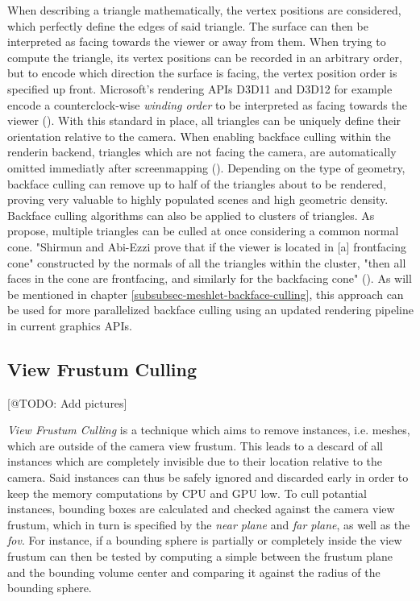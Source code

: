 \noindent
When describing a triangle mathematically, the vertex positions are considered, which perfectly define the edges of 
said triangle. The surface can then be interpreted as facing towards the viewer or away from them. 
When trying to compute the triangle, its vertex positions can be recorded in an arbitrary order, but to encode which direction 
the surface is facing, the vertex position order is specified up front. Microsoft's rendering \ac{API}s D3D11 and D3D12 for 
example encode a counterclock-wise \emph{winding order} to be interpreted as facing towards the viewer (\cite{D3DTopology2020}).
With this standard in place, all triangles can be uniquely define their orientation relative to the camera.
When enabling backface culling within the renderin backend, triangles which are not facing the camera, are automatically omitted 
immediatly after screenmapping (\cite{AkenineMoeller2018}). Depending on the type of geometry, backface culling can remove up to 
half of the triangles about to be rendered, proving very valuable to highly populated scenes and high geometric density.\\

Backface culling algorithms can also be applied to clusters of triangles. As \cite{Shirmun1993} propose, multiple triangles can 
be culled at once considering a common normal cone. "Shirmun and Abi-Ezzi \cite{Shirmun1993} prove that if the viewer is located 
in [a] frontfacing cone" constructed by the normals of all the triangles within the cluster, "then all faces in the cone are 
frontfacing, and similarly for the backfacing cone" (\cite{AkenineMoeller2018}). As will be mentioned in chapter 
\ref{subsubsec-meshlet-backface-culling}, this approach can be used for more parallelized backface culling using an updated 
rendering pipeline in current graphics \ac{API}s.

\subsection{View Frustum Culling} \label{subsec-view-frustum-culling}

[@TODO: Add pictures]

\emph{View Frustum Culling} is a technique which aims to remove instances, i.e. meshes, which are outside of the camera view frustum.
This leads to a descard of all instances which are completely invisible due to their location relative to the camera. Said 
instances can thus be safely ignored and discarded early in order to keep the memory computations by \ac{CPU} and \ac{GPU} low.
To cull potantial instances, bounding boxes are calculated and checked against the camera view frustum, which in turn is specified by 
the \emph{near plane} and \emph{far plane}, as well as the \emph{fov}. For instance, if a bounding sphere is partially or completely 
inside the view frustum can then be tested by computing a simple  between the frustum plane and the bounding volume 
center and comparing it against the radius of the bounding sphere. \\

